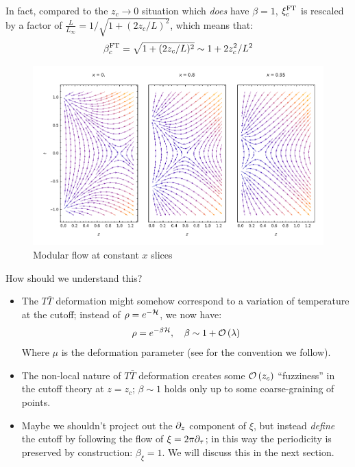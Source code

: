 \documentclass[11pt,a4paper,utf8]{article}
\newcommand{\TTbar}{\ensuremath{T\bar{T}}\xspace}
\begin{document}
	 In fact, compared to the $z_c \to 0$ situation which \textit{does} have $\beta = 1$, $\xi^{\mathrm{FT}}_c$ is rescaled by a factor of $
		\frac{L}{L_\infty}
		= 1/\sqrt{1 + (2z_c/L)^2}
	$, which means that:
	\begin{equation}
		\beta^{\mathrm{FT}}_c
		= \sqrt{1 + (2z_c/L)^2}
		\sim 1 + 2z_c^2 / L^2
	\end{equation}
	
	\begin{figure}[!ht]
	\vspace{-1.5ex}
	\centering
	\includegraphics[width=.8\linewidth]{img/modFlowXsection.pdf}
	\hspace{2em}
	\vspace{-2ex}
	\caption{Modular flow at constant $x$ slices}
	\end{figure}
	
\pagebreak[3]
	
	How should we understand this?
	\begin{itemize}
	\item The \TTbar deformation might somehow correspond to a variation of temperature at the cutoff; instead of $\rho = e^{-\mathcal{H}}$, we now have:
	\begin{equation}
		\rho = e^{-\beta\mathcal{H}},
	\quad \beta \sim 1 + \mathcal{O}\left(\lambda\right)
	\end{equation}
	Where $\mu$ is the deformation parameter (see \cite{Apolo:2019zai} for the convention we follow). 
	
	\item The non-local nature of \TTbar deformation creates some $\mathcal{O}\left(z_c\right)$ ``fuzziness'' in the cutoff theory at $z = z_c$; $\beta \sim 1$ holds only up to some coarse-graining of points. 
	
	\item Maybe we shouldn't project out the $\partial_{z}$ component of $\xi$, but instead \textit{define} the cutoff by following the flow of $\xi = 2\pi\partial_{\tau}$; in this way the periodicity is preserved by construction: $\beta_\xi = 1$. We will discuss this in the next section. 
	\end{itemize}
	
\end{document}
